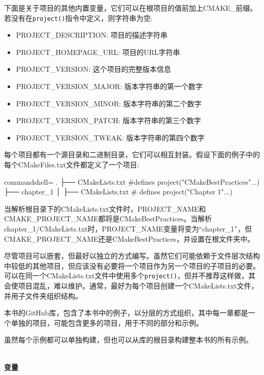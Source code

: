 下面是关于项目的其他内置变量，它们可以在根项目的值前加上CMAKE\_前缀。若没有在\texttt{project()}指令中定义，则字符串为空:

\begin{itemize}
\item 
PROJECT\_DESCRIPTION: 项目的描述字符串

\item 
PROJECT\_HOMEPAGE\_URL: 项目的URL字符串

\item 
PROJECT\_VERSION: 这个项目的完整版本信息

\item 
PROJECT\_VERSION\_MAJOR: 版本字符串的第一个数字

\item 
PROJECT\_VERSION\_MINOR: 版本字符串的第二个数字

\item 
PROJECT\_VERSION\_PATCH: 版本字符串的第三个数字

\item 
PROJECT\_VERSION\_TWEAK: 版本字符串的第四个数字
\end{itemize}

每个项目都有一个源目录和二进制目录，它们可以相互封装。假设下面的例子中的每个CMakeFiles.txt文件都定义了一个项目:

\begin{tcblisting}{commandshell={}}
.
├── CMakeLists.txt #defines project("CMakeBestPractices"...)
├── chapter_1
│      ├── CMakeLists.txt # defines project("Chapter 1"...)
\end{tcblisting}

当解析根目录下的CMakeLists.txt文件时，PROJECT\_NAME和CMAKE\_PROJECT\_NAME都将是CMakeBestPractices。当解析chapter\_1/CMakeLists.txt时，PROJECT\_NAME变量将变为“chapter\_1”，但CMAKE\_PROJECT\_NAME还是CMakeBestPractices，并设置在根文件夹中。

尽管项目可以嵌套，但最好以独立的方式编写。虽然它们可能依赖于文件层次结构中较低的其他项目，但应该没有必要将一个项目作为另一个项目的子项目的必要。可以在同一个CMakeLists.txt文件中使用多个\texttt{project()}，但并不推荐这样做，其会使项目混乱，难以维护。通常，最好为每个项目创建一个CMakeLists.txt文件，并用子文件夹组织结构。

本书的GitHub库，包含了本书中的例子，以分层的方式组织，其中每一章都是一个单独的项目，可能包含更多的项目，用于不同的部分和示例。

虽然每个示例都可以单独构建，但也可以从库的根目录构建整本书的所有示例。

\hspace*{\fill} \\ %
\noindent
\textbf{变量}

